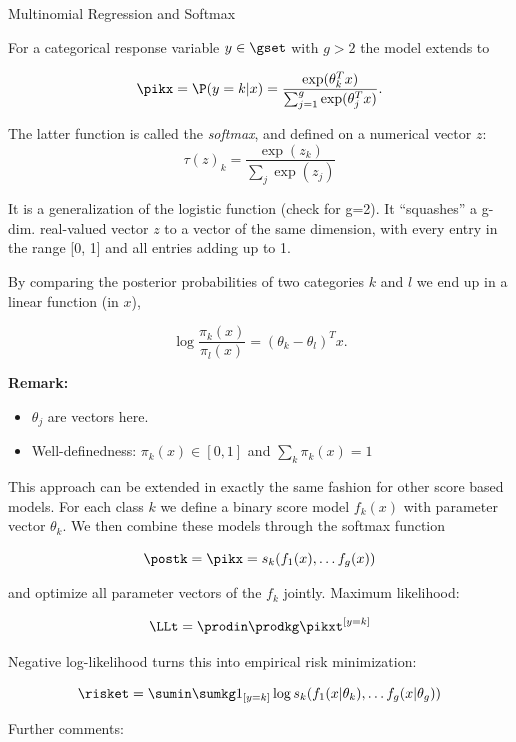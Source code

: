 \begin{vbframe}{Multinomial Regression and Softmax}

For a categorical response variable $y \in \gset$ with $g>2$ the model extends to

$$
\pikx = \P(y = k | x) = \frac{\exp(\theta_k^Tx)}{\sum_{j=1}^g\exp(\theta_j^Tx)}.
$$

The latter function is called the \emph{softmax}, and defined on a numerical vector $z$:
$$
\tau(z)_k = \frac{\exp(z_k)}{\sum_{j}\exp(z_j)}
$$

It is a generalization of the logistic function (check for g=2). It \enquote{squashes} a g-dim. real-valued vector $z$ to a vector of the same dimension,
with every entry in the range [0, 1] and all entries adding up to 1.

\framebreak

By comparing the posterior probabilities of two categories $k$ and $l$ we end up in a linear function (in $x$),

$$
\log\frac{\pi_k(x)}{\pi_l(x)} = (\theta_k-\theta_l)^Tx.
$$

\textbf{Remark:}
\begin{itemize}
\item $\theta_j$ are vectors here.
\item Well-definedness: $\pi_k(x) \in [0, 1]$ and $\sum_k \pi_k(x) = 1$

\end{itemize}

\framebreak

This approach can be extended in exactly the same fashion for other score based models.
For each class $k$ we define a binary score model $f_k(x)$ with parameter vector $\theta_k$.
We then combine these models through the softmax function

$$
\postk = \pikx = s_k(f_1(x), \ldots f_g(x))
$$

and optimize all parameter vectors of the $f_k$ jointly. Maximum likelihood:

$$
\LLt = \prodin \prodkg \pikxt^{[y = k]}
$$

Negative log-likelihood turns this into empirical risk minimization:

$$
\risket = \sumin \sumkg 1_{[y = k]} \log s_k(f_1(x | \theta_k), \ldots f_g(x | \theta_g))
$$

\framebreak

Further comments:

\begin{itemize}


\end{itemize}
\end{vbframe}

